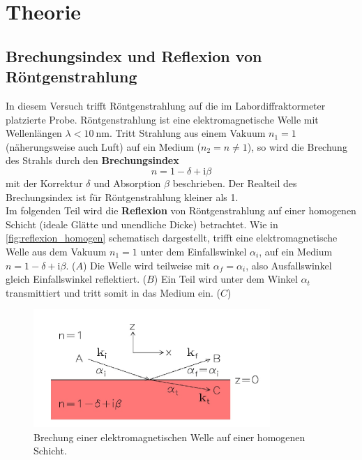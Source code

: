 \section{Theorie}
\label{sec:theorie}
\subsection{Brechungsindex und Reflexion von Röntgenstrahlung}
In diesem Versuch trifft Röntgenstrahlung auf die im Labordiffraktormeter platzierte Probe.
Röntgenstrahlung ist eine elektromagnetische Welle mit Wellenlängen $\lambda < \SI{10}{\nano\metre}$.
Tritt Strahlung aus einem Vakuum $n_1 = 1$ (näherungsweise auch Luft) auf ein Medium ($n_2 = n \neq 1$), so wird die Brechung des Strahls durch den \textbf{Brechungsindex}
\begin{equation}
    n = 1 - \delta + \mathrm{i} \beta
    \label{eqn:brechungsindex}
\end{equation}
mit der Korrektur $\delta$ und Absorption $\beta$ beschrieben.
Der Realteil des Brechungsindex ist für Röntgenstrahlung kleiner als 1.
\\
Im folgenden Teil wird die \textbf{Reflexion} von Röntgenstrahlung auf einer homogenen Schicht (ideale Glätte und unendliche Dicke) betrachtet.
Wie in \autoref{fig:reflexion_homogen} schematisch dargestellt, trifft eine elektromagnetische Welle aus dem Vakuum $n_1=1$ unter dem Einfallswinkel $\alpha_i$, auf ein Medium $n = 1 - \delta + \mathrm{i} \beta$. ($A$)
Die Welle wird teilweise mit $\alpha_f = \alpha_i$, also Ausfallswinkel gleich Einfallswinkel reflektiert. ($B$)
Ein Teil wird unter dem Winkel $\alpha_t$ transmittiert und tritt somit in das Medium ein. ($C$)
\begin{figure}
    \centering
    \includegraphics[width=0.8\textwidth]{content/data/reflexion_homogen.jpg}
    \caption{Brechung einer elektromagnetischen Welle auf einer homogenen Schicht.\cite[4]{alte_anleitung}}
    \label{fig:reflexion_homogen}
\end{figure}
\FloatBarrier
